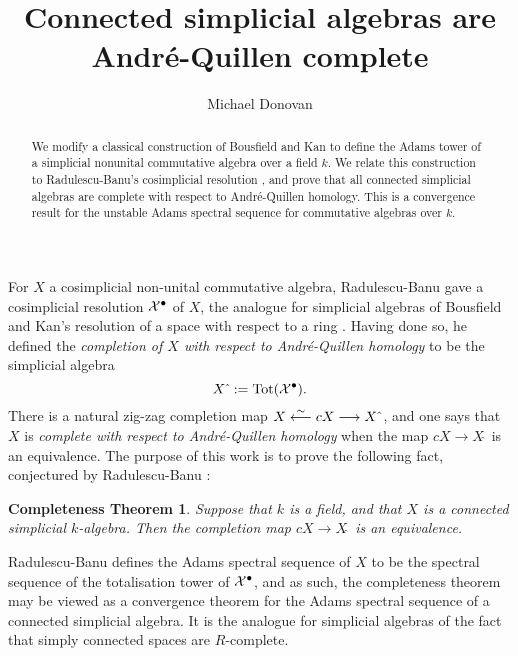 \documentclass[11pt]{amsart}
\title{Connected simplicial algebras are Andr\'e-Quillen complete}
\author{Michael Donovan}
\theoremstyle{plain}
\newtheorem*{completenesstheorem}{Completeness Theorem}
\begin{document}
\maketitle

\begin{abstract}
We modify a classical construction of Bousfield and Kan \cite{BousKanSSeq.pdf} to define the Adams tower of a simplicial nonunital commutative algebra over a field $k$. We relate this construction to Radulescu-Banu's cosimplicial resolution \cite{radelescuBanu.pdf}, and prove that all connected simplicial algebras are complete with respect to Andr\'e-Quillen homology. This is a convergence result for the unstable Adams spectral sequence for commutative algebras over $k$.
\end{abstract}
For $X$ a cosimplicial non-unital commutative algebra, Radulescu-Banu \cite{radelescuBanu.pdf} gave a cosimplicial resolution $\mathcal{X}^\bullet$ of $X$, the analogue for simplicial algebras of Bousfield and Kan's resolution of a space with respect to a ring \cite{BousKanSSeq.pdf}. Having done so, he defined the \emph{completion of $X$ with respect to Andr\'e-Quillen homology} to be the simplicial algebra
\[X\hat{\ }:=\textup{Tot}(\calX^\bullet).\]
There is a natural zig-zag completion map $X\overset{\sim}{\longleftarrow} cX\longrightarrow X\hat{\ }$, and one says that $X$ is \emph{complete with respect to Andr\'e-Quillen homology} when the map $cX\to X\hat{\ }$ is an equivalence. The purpose of this work is to prove the following fact, conjectured by Radulescu-Banu \cite{radelescuBanu.pdf}:
\begin{completenesstheorem}\label{completenesstheorem}
Suppose that $k$ is a field, and that $X$ is a connected simplicial $k$-algebra. Then the completion map $cX\to X\hat{\ }$ is an equivalence.
\end{completenesstheorem}
\noindent Radulescu-Banu defines the Adams spectral sequence of $X$ to be the spectral sequence of the totalisation tower of $\mathcal{X}^\bullet$, and as such, the completeness theorem may be viewed as a convergence theorem for the Adams spectral sequence of a connected simplicial algebra. It is the analogue for simplicial algebras of the fact that simply connected spaces are $R$-complete.
\end{document}
